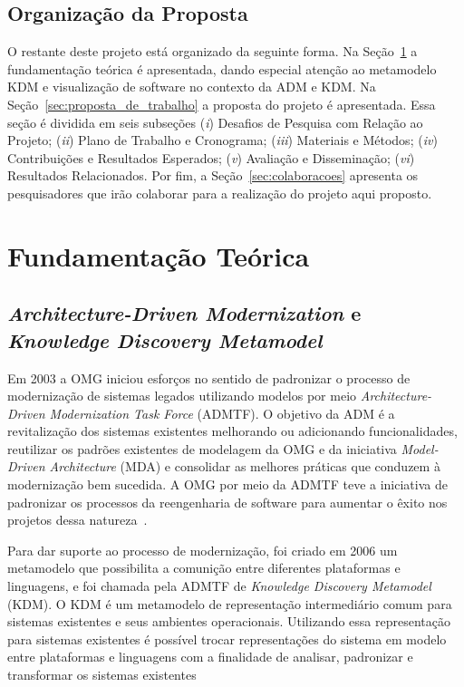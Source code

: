 \documentclass[12pt]{article}
\begin{document}
\subsection{Organização da Proposta}

O restante deste projeto está organizado da seguinte forma. Na Seção~\ref{sec:fundamentacao_teorica} a fundamentação teórica é apresentada, dando especial atenção ao metamodelo KDM e visualização de software no contexto da ADM e KDM. Na Seção~\ref{sec:proposta_de_trabalho} a proposta do projeto é apresentada. Essa seção é dividida em seis subseções (\textit{i}) Desafios de Pesquisa com Relação ao Projeto; (\textit{ii}) Plano de Trabalho e Cronograma; (\textit{iii}) Materiais e Métodos; (\textit{iv}) Contribuições e Resultados Esperados; (\textit{v}) Avaliação e Disseminação; (\textit{vi}) Resultados Relacionados. Por fim, a Seção~\ref{sec:colaboracoes} apresenta os pesquisadores que irão colaborar para a realização do projeto aqui proposto.

\section{Fundamentação Teórica}\label{sec:fundamentacao_teorica}

\subsection{\textit{Architecture-Driven Modernization} e \textit{Knowledge Discovery Metamodel}}

Em 2003 a OMG iniciou esforços no sentido de padronizar o processo de modernização de sistemas legados utilizando modelos por meio \textit{Architecture-Driven Modernization Task Force} (ADMTF). O objetivo da ADM é a revitalização dos sistemas existentes melhorando ou adicionando funcionalidades, reutilizar os padrões existentes de modelagem da OMG e da iniciativa \textit{Model-Driven Architecture} (MDA) e consolidar as melhores práticas que conduzem à modernização bem sucedida. A OMG por meio da ADMTF teve a iniciativa de padronizar os processos da reengenharia de software para aumentar o êxito nos projetos dessa natureza~\cite{PerezCastillo:2011jo}. 

Para dar suporte ao processo de modernização, foi criado em 2006 um metamodelo que possibilita a comunição entre diferentes plataformas e linguagens, e foi chamada pela ADMTF de \textit{Knowledge Discovery Metamodel} (KDM). O KDM é um metamodelo de representação intermediário comum para sistemas existentes e seus ambientes operacionais. Utilizando essa representação para sistemas existentes é possível trocar representações do sistema em modelo entre plataformas e linguagens com a finalidade de analisar, padronizar e transformar os sistemas existentes~\cite{PerezCastillo:2011jo, ADMCHAPTERR}
\end{document}
